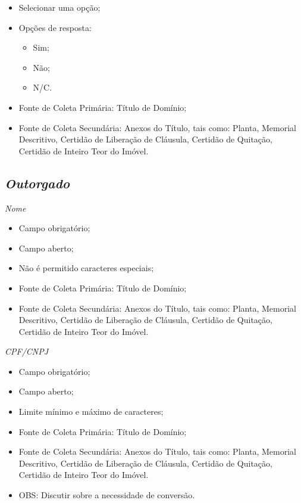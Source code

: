 \documentclass[
  letterpaper,
]{report}
\providecommand{\tightlist}{%
  \setlength{\itemsep}{0pt}\setlength{\parskip}{0pt}}\usepackage{longtable,booktabs,array}
\begin{document}
\begin{itemize}
\tightlist
\item
  Selecionar uma opção;
\item
  Opções de resposta:

  \begin{itemize}
  \tightlist
  \item
    Sim;
  \item
    Não;
  \item
    N/C.
  \end{itemize}
\item
  Fonte de Coleta Primária: Título de Domínio;
\item
  Fonte de Coleta Secundária: Anexos do Título, tais como: Planta,
  Memorial Descritivo, Certidão de Liberação de Cláusula, Certidão de
  Quitação, Certidão de Inteiro Teor do Imóvel.
\end{itemize}

\hypertarget{outorgado}{%
\subsection{\texorpdfstring{\emph{Outorgado}}{Outorgado}}\label{outorgado}}

\emph{Nome}

\begin{itemize}
\tightlist
\item
  Campo obrigatório;
\item
  Campo aberto;
\item
  Não é permitido caracteres especiais;
\item
  Fonte de Coleta Primária: Título de Domínio;
\item
  Fonte de Coleta Secundária: Anexos do Título, tais como: Planta,
  Memorial Descritivo, Certidão de Liberação de Cláusula, Certidão de
  Quitação, Certidão de Inteiro Teor do Imóvel.
\end{itemize}

\emph{CPF/CNPJ}

\begin{itemize}
\tightlist
\item
  Campo obrigatório;
\item
  Campo aberto;
\item
  Limite mínimo e máximo de caracteres;
\item
  Fonte de Coleta Primária: Título de Domínio;
\item
  Fonte de Coleta Secundária: Anexos do Título, tais como: Planta,
  Memorial Descritivo, Certidão de Liberação de Cláusula, Certidão de
  Quitação, Certidão de Inteiro Teor do Imóvel.
\item
  OBS: Discutir sobre a necessidade de conversão.
\end{itemize}
\end{document}

